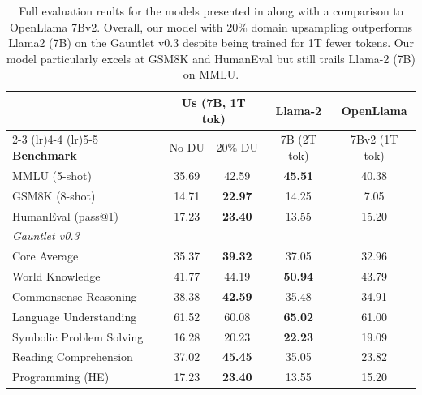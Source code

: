 \documentclass[10pt]{article} %
\begin{document}
\begin{table}[!htp]
    \centering
    \begin{tabular}{l c c c c} \toprule 
         &  \multicolumn{2}{c}{\textbf{Us} (7B, 1T tok)} & \textbf{Llama-2} & \textbf{OpenLlama} \\
         \cmidrule(lr){2-3}
         \cmidrule(lr){4-4}
         \cmidrule(lr){5-5}
         \textbf{Benchmark}  & No DU & 20\% DU & 7B (2T tok) & 7Bv2 (1T tok)   \\ \midrule 
         MMLU (5-shot)  & 35.69 & 42.59 & {\bf \color{c2} 45.51} & 40.38 \\
         GSM8K (8-shot) & 14.71 & {\bf \color{c2} 22.97} & 14.25 & 7.05 \\
         HumanEval (pass@1) & 17.23 & {\bf \color{c2} 23.40} & 13.55 & 15.20\\
         \midrule
         \textit{Gauntlet v0.3} \\
         \quad Core Average & 35.37 & {\bf \color{c2} 39.32} & 37.05 & 32.96   \\
         \quad World Knowledge  & 41.77 & 44.19 & {\bf \color{c2} 50.94} & 43.79  \\
         \quad Commonsense Reasoning    & 38.38 & {\bf \color{c2} 42.59} & 35.48 & 34.91  \\
         \quad Language Understanding   & 61.52 & 60.08 & {\bf \color{c2} 65.02} & 61.00 \\
         \quad Symbolic Problem Solving & 16.28 & 20.23 & {\bf \color{c2} 22.23} & 19.09  \\
         \quad Reading Comprehension    & 37.02 & {\bf \color{c2} 45.45} & 35.05 & 23.82  \\
         \quad Programming (HE) & 17.23 & {\bf \color{c2} 23.40} & 13.55 & 15.20\\
         \bottomrule
    \end{tabular}
    \caption{Full evaluation reults for the models presented in  along with a comparison to OpenLlama 7Bv2.  Overall, our model with 20\% domain upsampling outperforms Llama2 (7B) on the Gauntlet v0.3 despite being trained for 1T fewer tokens.  Our model particularly excels at GSM8K and HumanEval but still trails Llama-2 (7B) on MMLU.}
    \label{tab:cl-model-eval2}
\end{table}
\end{document}
